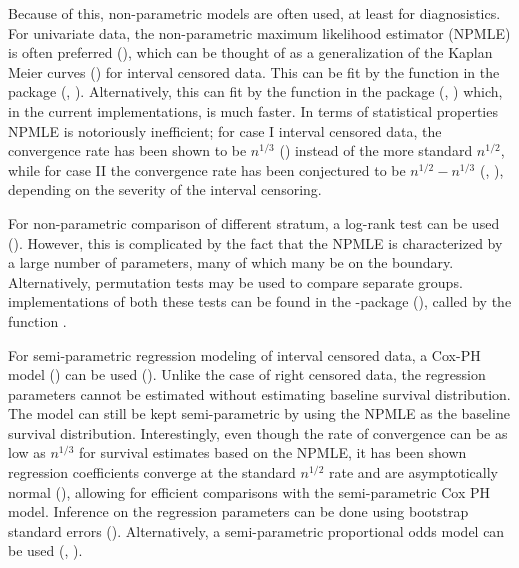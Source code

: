 \documentclass[article]{jss}
\begin{document}
	Because of this, non-parametric models are often used, at least for diagnosistics. For univariate data, the non-parametric maximum likelihood estimator (NPMLE) is often preferred (\cite{Turnbull_1976}), which can be thought of as a generalization of the Kaplan Meier curves (\cite{KM_curve}) for interval censored data. This can be fit by the function  in the package  (\cite{Icens}, \cite{EMICM}). Alternatively, this can fit by the function  in the package  (\cite{MLEcens}, \cite{SupRedAlg}) which, in the current implementations, is much faster. In terms of statistical properties NPMLE is notoriously inefficient; for case I interval censored data, the convergence rate has been shown to be $n^{1/3}$ (\cite{Case1Con}) instead of the more standard $n^{1/2}$, while for case II the convergence rate has been conjectured to be $n^{1/2} - n^{1/3}$ (\cite{Case2Con1}, \cite{Case2Con2}), depending on the severity of the interval censoring. 
	 
	 For non-parametric comparison of different stratum, a log-rank test can be used (\cite{ic_logrankTests}). However, this is complicated by the fact that the NPMLE is characterized by a large number of parameters, many of which many be on the boundary. Alternatively, permutation tests may be used to compare separate groups.  implementations of both these tests can be found in the -package  (\cite{intervalPackage}), called by the function .  
	 
	For semi-parametric regression modeling of interval censored data, a Cox-PH model (\cite{CoxPH}) can be used (\cite{ic_coxph}). Unlike the case of right censored data, the regression parameters cannot be estimated without estimating baseline survival distribution. The model can still be kept semi-parametric by using the NPMLE as the baseline survival distribution. Interestingly, even though the rate of convergence can be as low as $n^{1/3}$ for survival estimates based on the NPMLE, it has been shown regression coefficients converge at the standard $n^{1/2}$ rate and are asymptotically normal (\cite{ic_coxph_asyp}), allowing for efficient comparisons with the semi-parametric Cox PH model. Inference on the regression parameters can be done using bootstrap standard errors (\cite{bootstrap}). Alternatively, a semi-parametric proportional odds model can be used (\cite{propOdds1}, \cite{propOdds2}). 
\end{document}
